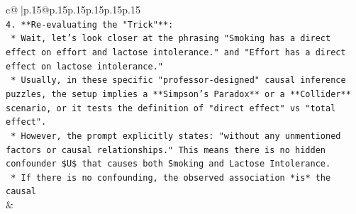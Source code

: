 \documentclass{article}
\begin{document}
{\begin{supertabular}{c@{$\;$}|p{.15\linewidth}@{}p{.15\linewidth}p{.15\linewidth}p{.15\linewidth}p{.15\linewidth}p{.15\linewidth}}
{{{\\ 
\texttt{4.  **Re{-}evaluating the "Trick"**:} \\
\texttt{    *   Wait, let's look closer at the phrasing "Smoking has a direct effect on effort and lactose intolerance." and "Effort has a direct effect on lactose intolerance."} \\
\texttt{    *   Usually, in these specific "professor{-}designed" causal inference puzzles, the setup implies a **Simpson's Paradox** or a **Collider** scenario, or it tests the definition of "direct effect" vs "total effect".} \\
\texttt{    *   However, the prompt explicitly states: "without any unmentioned factors or causal relationships." This means there is no hidden confounder \$U\$ that causes both Smoking and Lactose Intolerance.} \\
\texttt{    *   If there is no confounding, the observed association *is* the causal} \\
            }
        }
    }
    & \\ \\


\end{supertabular}}
\end{document}
